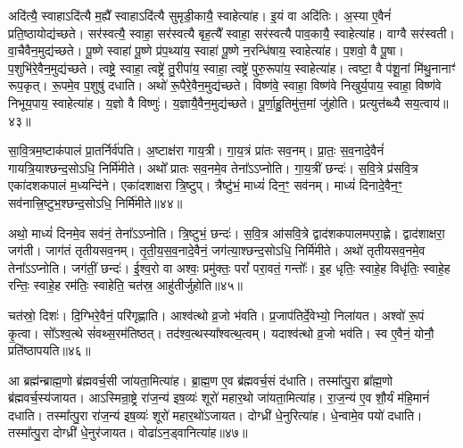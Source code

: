 अदि॑त्यै॒ स्वाहा\-ऽदि॑त्यै म॒ह्यै᳚ स्वाहा\-ऽदि॑त्यै सुमृडी॒कायै॒ स्वाहेत्या॑ह।
इ॒यं वा अदि॑तिः।
अ॒स्या ए॒वैनं॑ प्रति॒ष्ठायोद्य॑च्छते।
सर॑स्वत्यै॒ स्वाहा॒ सर॑स्वत्यै बृह॒त्यै᳚ स्वाहा॒ सर॑स्वत्यै पाव॒कायै॒ स्वाहेत्या॑ह।
वाग्वै सर॑स्वती।
वा॒चैवैन॒मुद्य॑च्छते।
पू॒ष्णे स्वाहा॑ पू॒ष्णे प्र॑प॒थ्या॑य॒ स्वाहा॑ पू॒ष्णे न॒रन्धि॑षाय॒ स्वाहेत्या॑ह।
प॒शवो॒ वै पू॒षा।
प॒शुभि॑रे॒वैन॒मुद्य॑च्छते।
त्वष्ट्रे॒ स्वाहा॒ त्वष्ट्रे॑ तु॒रीपा॑य॒ स्वाहा॒ त्वष्ट्रे॑ पुरु॒रूपा॑य॒ स्वाहेत्या॑ह।
त्वष्टा॒ वै प॑शू॒नां मि॑थु॒नानाꣳ॑ रूप॒कृत्।
रू॒पमे॒व प॒शुषु॑ दधाति।
अथो॑ रू॒पैरे॒वैन॒मुद्य॑च्छते।
विष्ण॑वे॒ स्वाहा॒ विष्ण॑वे निखुर्य॒पाय॒ स्वाहा॒ विष्ण॑वे निभूय॒पाय॒ स्वाहेत्या॑ह।
य॒ज्ञो वै विष्णुः॑।
य॒ज्ञायै॒वैन॒मुद्य॑च्छते।
पू॒र्णा॒हु॒तिमु॑त्त॒मां जु॑होति।
प्रत्युत्त॑ब्ध्यै सय॒त्वाय॑॥४३॥\ip\anuvakamend[य॒च्छ॒ते॒ पु॒रु॒रूपा॑य॒ स्वाहेत्या॑हा॒ष्टौ च॑]

सा॒वि॒त्रम॒ष्टा\-क॑पालं प्रा॒तर्निर्व॑पति।
अ॒ष्टाक्ष॑रा गाय॒त्री।
गा॒य॒त्रं प्रा॑तः सव॒नम्।
प्रा॒तः॒ स॒व॒नादे॒वैनं॑ गायत्रि॒याश्छन्द॒सो\-ऽधि॒ निर्मि॑मीते।
अथो᳚ प्रातः सव॒नमे॒व तेना᳚ऽऽप्नोति।
गा॒य॒त्रीं छन्दः॑।
स॒वि॒त्रे प्र॑सवि॒त्र एका॑\-दश\-कपालं म॒ध्यन्दि॑ने।
एका॑दशाक्षरा त्रि॒ष्टुप्।
त्रैष्टु॑भं॒ माध्यं॑ दिन॒ꣳ॒ सव॑नम्।
माध्यं॑ दिनादे॒वैन॒ꣳ॒ सव॑नात्त्रि॒ष्टुभ॒श्छन्द॒सोऽधि॒ निर्मि॑मीते॥४४॥\ip

अथो॒ माध्यं॑ दिनमे॒व सव॑नं॒ तेना᳚ऽऽप्नोति।
त्रि॒ष्टुभं॒ छन्दः॑।
स॒वि॒त्र आ॑सवि॒त्रे द्वाद॑शकपालमपरा॒ह्णे।
द्वाद॑शाक्षरा॒ जग॑ती।
जाग॑तं तृतीयसव॒नम्।
तृ॒ती॒य॒स॒व॒नादे॒वैनं॒ जग॑त्या॒श्छन्द॒सोऽधि॒ निर्मि॑मीते।
अथो॑ तृतीयसव॒नमे॒व तेना᳚ऽऽप्नोति।
जग॑तीं॒ छन्दः॑।
ई॒श्व॒रो वा अश्वः॒ प्रमु॑क्तः॒ परां᳚ परा॒वतं॒ गन्तोः᳚।
इ॒ह धृतिः॒ स्वाहे॒ह विधृ॑तिः॒ स्वाहे॒ह रन्तिः॒ स्वाहे॒ह रम॑तिः॒ स्वाहेति॒ चत॑स्र॒ आहु॑तीर्जुहोति॥४५॥\ip

चत॑स्रो॒ दिशः॑।
दि॒ग्भिरे॒वैनं॒ परि॑गृह्णाति।
आश्व॑त्थो व्र॒जो भ॑वति।
प्र॒जा\-प॑तिर्दे॒वेभ्यो॒ निला॑यत।
अश्वो॑ रू॒पं कृ॒त्वा।
सो᳚ऽश्व॒त्थे सं॑वथ्स॒रम॑तिष्ठत्।
तद॑श्व॒त्थस्या᳚श्वत्थ॒त्वम्।
यदाश्व॑त्थो व्र॒जो भव॑ति।
स्व ए॒वैनं॒ योनौ॒ प्रति॑\-ष्ठापयति॥४६॥\ip\anuvakamend[त्रि॒ष्टुभ॒श्छन्द॒सोऽधि॒ निर्मि॑मीते जुहोति॒ नव॑ च]

आ ब्रह्म॑न्ब्राह्म॒णो ब्र॑ह्म\-वर्च॒सी जा॑यता॒मित्या॑ह।
ब्रा॒ह्म॒ण ए॒व ब्र॑ह्म\-वर्च॒सं द॑धाति।
तस्मा᳚त्पु॒रा ब्रा᳚ह्म॒णो ब्र॑ह्म\-वर्च॒स्य॑जायत।
आऽस्मिन्रा॒ष्ट्रे रा॑ज॒न्य॑ इष॒व्यः॑ शूरो॑ महार॒थो जा॑यता॒मित्या॑ह।
रा॒ज॒न्य॑ ए॒व शौ॒र्यं म॑हि॒मानं॑ दधाति।
तस्मा᳚त्पु॒रा रा॑ज॒न्य॑ इष॒व्यः॑ शूरो॑ महार॒थो॑\-ऽजायत।
दोग्ध्री॑ धे॒नुरित्या॑ह।
धे॒न्वामे॒व पयो॑ दधाति।
तस्मा᳚त्पु॒रा दोग्ध्री॑ धे॒नुर॑जायत।
वोढा॑\-ऽन॒ड्वानित्या॑ह॥४७॥\ip

